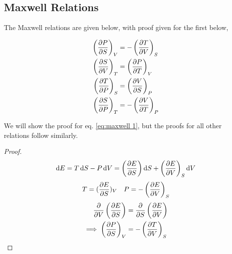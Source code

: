 \documentclass{book}
\begin{document}
\subsection{Maxwell Relations}
The Maxwell relations are given below, with proof given for the first below,
\begin{tcolorbox}
	\begin{align}
		\left(\pdv{P}{S}\right)_V &= - \left(\pdv{T}{V}\right)_S \label{eq:maxwell 1}\\
		\left(\pdv{S}{V}\right)_T &= \left(\pdv{P}{T}\right)_V \\
		\left(\pdv{T}{P}\right)_S &= \left(\pdv{V}{S}\right)_P \\
		\left(\pdv{S}{P}\right)_T &= - \left(\pdv{V}{T}\right)_P 
	\end{align}
\end{tcolorbox}\noindent
We will show the proof for eq. \eqref{eq:maxwell 1}, but the proofs for all other relations follow similarly.
\begin{proof}
	\begin{equation*}
		\begin{split}
			\dd{E} = T\dd{S} - P\dd{V} = \left(\pdv{E}{S}\right) \dd{S} + \left(\pdv{E}{V}\right)_S \dd{V}
		\end{split}
	\end{equation*}
	\begin{align*}
		T = (\pdv{E}{S})_V && P = -\left(\pdv{E}{V}\right)_S
	\end{align*}
	\begin{equation*}
		\begin{split}
			\pdv{V}\left(\pdv{E}{S}\right)  & = \pdv{S}\left(\pdv{E}{V}\right)\\
			\implies \left(\pdv{P}{S}\right)_V & = - \left(\pdv{T}{V}\right)_S 
		\end{split}
	\end{equation*}
\end{proof}
\end{document}
